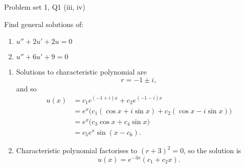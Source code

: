 \begin{problem}{Problem set 1, Q1 (iii, iv)}{}
        

    Find general solutions of:
    \begin{enumerate}
        \item $u''+ 2u' + 2u = 0$
        \item $u'' + 6u' + 9 = 0$
    \end{enumerate}

    \tcblower
    
    \begin{enumerate}
        \item Solutions to characteristic polynomial are
            $$ r = -1 \pm i , $$
        and so
            \begin{align*}
                u(x) &= c_1 e^{(-1 + i)x} + c_2 e^{(-1 - i)x} \\
                &= e^x \biggl( 
                    c_1 (\cos x + i\sin x) 
                    + c_2 (\cos x - i\sin x) \biggr) \\
                &= e^x \biggl( c_3 \cos x
                    + c_4 \sin x \biggr) \\
                &= c_5 e^x \sin(x - c_6) .
            \end{align*}
        \item Characteristic polynomial factorises to $(r + 3)^2 = 0$, so the solution is
            $$ u(x) = e^{-3x} (c_1 + c_2 x) . $$
    \end{enumerate}

\end{problem}

